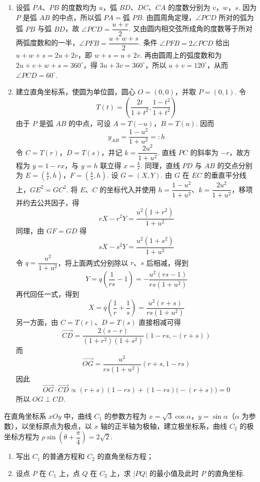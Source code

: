 \begin{solution}
\begin{enumerate}
\item 设弧 \(PA\)、\(PB\) 的度数均为 \(u\)，弧 \(BD\)、\(DC\)、\(CA\) 的度数分别为 \(v\)，\(w\)，\(s\). 因为 \(P\) 是弧 \(AB\) 的中点，所以弧 \(PA=\)弧 \(PB\). 由圆周角定理，\(\angle PCD\) 所对的弧为弧 \(PB\) 与弧 \(BD\)，故 \(\angle PCD=\dfrac{u+v}{2}\). 又由圆内相交弦所成角的度数等于所对两弧度数和的一半，\(\angle PFB=\dfrac{u+w+s}{2}\). 条件 \(\angle PFB=2\angle PCD\) 给出 \(u+w+s=2u+2v\)，即 \(w+s=u+2v\). 再由圆周上的弧度数和为 \(2u+v+w+s=360^\circ\)，得 \(3u+3v=360^\circ\)，所以 \(u+v=120^\circ\)，从而 \(\angle PCD=60^\circ\).
\item 建立直角坐标系，使圆为单位圆，圆心 \(O=(0,0)\)，并取 \(P=(0,1)\). 令
\[
T(t)=\left(\frac{2t}{1+t^2},\frac{1-t^2}{1+t^2}\right)
\]
由于 \(P\) 是弧 \(AB\) 的中点，可设 \(A=T(-u)\)，\(B=T(u)\). 因而
\[
y_{AB}=\frac{1-u^2}{1+u^2}=:h
\]
令 \(C=T(r)\)，\(D=T(s)\)，并记 \(k=\dfrac{2u^2}{1+u^2}\). 直线 \(PC\) 的斜率为 \(-r\)，故方程为 \(y=1-rx\)，与 \(y=h\) 联立得 \(x=\frac{k}{r}\). 同理，直线 \(PD\) 与 \(AB\) 的交点分别为
\(E=\left(\frac{k}{r},h\right)\)，\(F=\left(\frac{k}{s},h\right)\).
设 \(G=(X,Y)\). 由 \(G\) 在 \(EC\) 的垂直平分线上，\(GE^2=GC^2\). 将 \(E\)、\(C\) 的坐标代入并使用 \(h=\dfrac{1-u^2}{1+u^2}\)、\(k=\dfrac{2u^2}{1+u^2}\)，移项并约去公共因子，得
\[
rX-r^2Y=\frac{u^2(1+r^2)}{1+u^2}
\]
同理，由 \(GF=GD\) 得
\[
sX-s^2Y=\frac{u^2(1+s^2)}{1+u^2}
\]
令 \(q=\dfrac{u^2}{1+u^2}\)，将上面两式分别除以 \(r\)、\(s\) 后相减，得到
\[
Y=q\left(\frac1{rs}-1\right)=-\frac{u^2(rs-1)}{rs(1+u^2)}
\]
再代回任一式，得到
\[
X=q\left(\frac1r+\frac1s\right)=\frac{u^2(r+s)}{rs(1+u^2)}
\]
另一方面，由 \(C=T(r)\)、\(D=T(s)\) 直接相减可得
\[
\overrightarrow{CD}=\frac{2(s-r)}{(1+r^2)(1+s^2)}\left(1-rs,-(r+s)\right)
\]
而
\[
\overrightarrow{OG}=\frac{u^2}{rs(1+u^2)}\left(r+s,1-rs\right)
\]
因此
\[
\overrightarrow{OG}\cdot\overrightarrow{CD}\propto (r+s)(1-rs)+(1-rs)\bigl(-(r+s)\bigr)=0
\]
所以 \(OG\perp CD\).
\end{enumerate}
\end{solution}

\begin{problem}
在直角坐标系 \(xOy\) 中，曲线 \(C_1\) 的参数方程为 \(x=\sqrt3\cos\alpha\)，\(y=\sin\alpha\)（\(\alpha\) 为参数），以坐标原点为极点，以 \(x\) 轴的正半轴为极轴，建立极坐标系，曲线 \(C_2\) 的极坐标方程为 \(\rho\sin\left( \theta+\dfrac{\pi}{4} \right)=2\sqrt2\).

\begin{enumerate}
\item 写出 \(C_1\) 的普通方程和 \(C_2\) 的直角坐标方程；
\item 设点 \(P\) 在 \(C_1\) 上，点 \(Q\) 在 \(C_2\) 上，求 \(|PQ|\) 的最小值及此时 \(P\) 的直角坐标.
\end{enumerate}
\end{problem}

